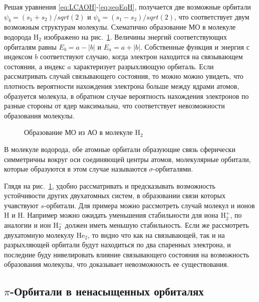 Решая уравнения \ref{eq:LCAOH}-\ref{eq:seqEqH}, получается две возможные орбитали $\psi_b=(s_1+s_2)/sqrt(2)$ и $\psi_b=(s_1-s_2)/sqrt(2)$, что соответствует двум возможным структурам молекулы. 
Схематично образование МО в молекуле водорода H${}_2$ изображено на рис.~\ref{fig:H2}. 
Величины энергий соответствующих орбиталям равны $E_b=a-|b|$ и $E_a=a+|b|$. 
Собственные функция и энергия с индексом $b$ соответствуют случаю, когда электрон находится на связывающем состоянии, а индекс $a$ характеризует разрыхляющую орбиталь. 
Если рассматривать случай связывающего состояния, то можно можно увидеть, что плотность вероятности нахождения электрона больше между ядрами атомов, образуется молекула, в обратном случае вероятность нахождения электронов по разные стороны от ядер максимальна, что соответствует невозможности образования молекулы.

\begin{figure}
\caption{Образование МО из АО в молекуле H${}_2$\cite{dyachkov2011}}
\label{fig:H2}
\end{figure}

В молекуле водорода, обе атомные орбитали образующие связь сферически симметричны вокруг оси соединяющей центры атомов, молекулярные орбитали, которые образуются в этом случае называются $\sigma$-орбиталями. 

Глядя на рис.~\ref{fig:H2}, удобно рассматривать и предсказывать возможность устойчивости других двухатомных систем, в образовании связи которых учавствуют $s$-орбитали. 
Для примера можно рассмотреть случай молекул и ионов H и H. 
Например можно ожидать уменьшения стабильности для иона H${}_2^+$, по аналогии и ион H${}_2^-$ должен иметь меньшую стабильность. 
Если же рассмотреть двухатомную молекулу He$_2$, то видно что как на связывающей, так и на разрыхляющей орбитали будут находиться по два спаренных электрона, и последние буду нивелировать влияние связывающего состояния на возможность образования молекулы, что доказывает невозможность ее существования.

\subsection{$\pi$-Орбитали в ненасыщенных орбиталях}

